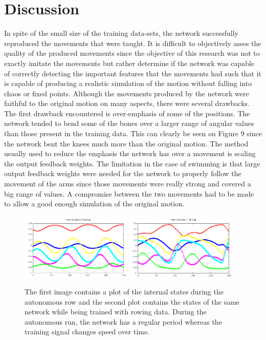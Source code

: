 \documentclass[letterpaper,9pt]{article}
\begin{document}
\section{Discussion}

In spite of the small size of the training data-sets, the network successfully reproduced the movements that were taught. It is difficult to objectively asses the quality of the produced movements since the objective of this research was not to exactly imitate the movements but rather determine if the network was capable of correctly detecting the important features that the movements had such that it is capable of producing a realistic simulation of the motion without falling into chaos or fixed points. Although the movements produced by the network were faithful to the original motion on many aspects, there were several drawbacks.\\

The first drawback encountered is over-emphasis of some of the positions. The network tended to bend some of the bones over a larger range of angular values than those present in the training data. This can clearly be seen on Figure 9 since the network bent the knees much more than the original motion. The method usually used to reduce the emphasis the network has over a movement is scaling the output feedback weights. The limitation in the case of swimming is that large output feedback weights were needed for the network to properly follow the movement of the arms since those movements were really strong and covered a big range of values. A compromise between the two movements had to be made to allow a good enough simulation of the original motion. \pagebreak

\begin{figure}[h!]
  \centering
  \includegraphics[width=200px]{Extra/out_states_rowing.png}
  \includegraphics[width=200px]{Extra/train_states_rowing.png}
  \caption[Internal States Evolution]{The first image contains a plot of the internal states during the autonomous row and the second plot contains the states of the same network while being trained with rowing data. During the autonomous run, the network has a regular period whereas the training signal changes speed over time.}
\end{figure}
\end{document}
